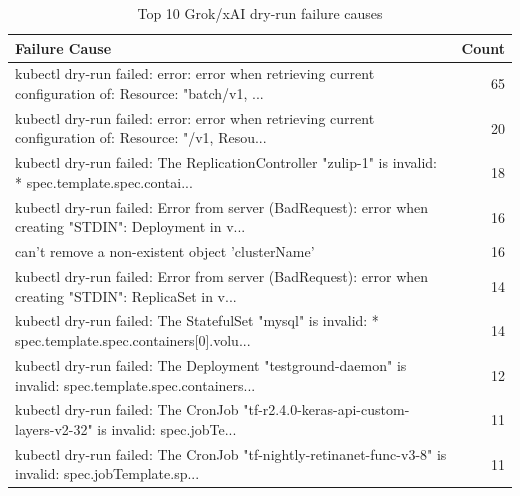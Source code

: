 \begin{table}[!ht]
\centering
\caption{Top 10 Grok/xAI dry-run failure causes}
\label{tab:grok_failures}
\begin{tabularx}{\columnwidth}{>{\raggedright\arraybackslash}X r}
\toprule
\textbf{Failure Cause} & \textbf{Count} \\
\midrule
kubectl dry-run failed: error: error when retrieving current configuration of: Resource: "batch/v1, ... & 65 \\
kubectl dry-run failed: error: error when retrieving current configuration of: Resource: "/v1, Resou... & 20 \\
kubectl dry-run failed: The ReplicationController "zulip-1" is invalid:  * spec.template.spec.contai... & 18 \\
kubectl dry-run failed: Error from server (BadRequest): error when creating "STDIN": Deployment in v... & 16 \\
can't remove a non-existent object 'clusterName' & 16 \\
kubectl dry-run failed: Error from server (BadRequest): error when creating "STDIN": ReplicaSet in v... & 14 \\
kubectl dry-run failed: The StatefulSet "mysql" is invalid:  * spec.template.spec.containers[0].volu... & 14 \\
kubectl dry-run failed: The Deployment "testground-daemon" is invalid: spec.template.spec.containers... & 12 \\
kubectl dry-run failed: The CronJob "tf-r2.4.0-keras-api-custom-layers-v2-32" is invalid: spec.jobTe... & 11 \\
kubectl dry-run failed: The CronJob "tf-nightly-retinanet-func-v3-8" is invalid: spec.jobTemplate.sp... & 11 \\
\bottomrule
\end{tabularx}
\end{table}
